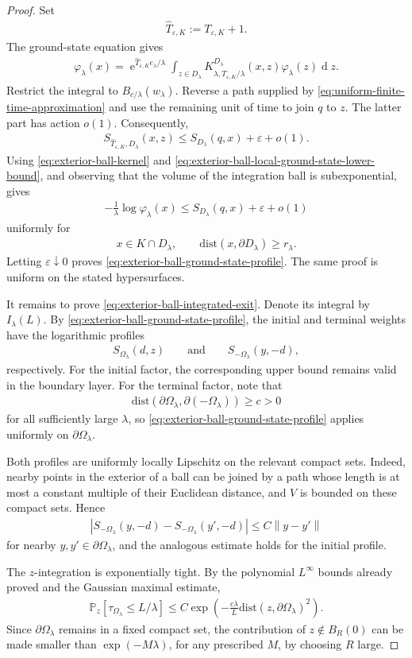 \documentclass[a4paper,10pt]{article}
\numberwithin{equation}{section}
\theoremstyle{plain}
\theoremstyle{plain}
\theoremstyle{plain}
\theoremstyle{plain}
\theoremstyle{plain}
\theoremstyle{remark}
\theoremstyle{definition}
\newcommand{\ee}{\operatorname{e}}
\newcommand{\PP}{\mathbb{P}}
\newcommand\norm[1]{\left\lVert#1\right\rVert}
\newcommand{\dif}{\operatorname{d}\!} %
\newcommand{\vf}{\varphi}
\newcommand{\dist}{\mathrm{dist}}
\newcommand{\abs}[1]{\left\lvert#1\right\rvert}
\newcommand{\eq}[1]{\begin{align*}#1\end{align*}}
\newcommand{\br}[1]{\left(#1\right)}
\begin{document}
\begin{proof}
Set
\eq{
\widehat T_{\varepsilon,K}
:=
T_{\varepsilon,K}+1.
}
The ground-state equation gives
\eq{
\vf_\lambda(x)
=
\ee^{
\widehat T_{\varepsilon,K}e_\lambda/\lambda
}
\int_{z\in D_\lambda}
K_{\lambda,
\widehat T_{\varepsilon,K}/\lambda}^{D_\lambda}(x,z)
\vf_\lambda(z)
\dif{z}.
}
Restrict the integral to
$B_{c/\lambda}(w_\lambda)$. Reverse a path supplied by
\cref{eq:uniform-finite-time-approximation} and use the remaining
unit of time to join $q$ to $z$. The latter part has action $o(1)$.
Consequently,
\eq{
S_{\widehat T_{\varepsilon,K},D_\lambda}(x,z)
\leq
S_{D_\lambda}(q,x)
+
\varepsilon
+
o(1).
}
Using \cref{eq:exterior-ball-kernel} and
\cref{eq:exterior-ball-local-ground-state-lower-bound}, and observing
that the volume of the integration ball is subexponential, gives
\eq{
-\frac1\lambda
\log
\vf_\lambda(x)
\leq
S_{D_\lambda}(q,x)
+
\varepsilon
+
o(1)
}
uniformly for
\eq{
x\in K\cap D_\lambda,
\qquad
\dist(x,\partial D_\lambda)
\geq
r_\lambda.
}
Letting $\varepsilon\downarrow0$ proves
\cref{eq:exterior-ball-ground-state-profile}. The same proof is
uniform on the stated hypersurfaces.

It remains to prove
\cref{eq:exterior-ball-integrated-exit}. Denote its integral by
$I_\lambda(L)$. By
\cref{eq:exterior-ball-ground-state-profile}, the initial and terminal
weights have the logarithmic profiles
\eq{
S_{\Omega_\lambda}(d,z)
\qquad\text{and}\qquad
S_{-\Omega_\lambda}(y,-d),
}
respectively. For the initial factor, the corresponding upper bound
remains valid in the boundary layer. For the terminal factor, note
that
\eq{
\dist\br{
\partial\Omega_\lambda,
\partial(-\Omega_\lambda)
}
\geq
c>0
}
for all sufficiently large $\lambda$, so
\cref{eq:exterior-ball-ground-state-profile} applies uniformly on
$\partial\Omega_\lambda$.

Both profiles are uniformly locally Lipschitz on the relevant compact
sets. Indeed, nearby points in the exterior of a ball can be joined by
a path whose length is at most a constant multiple of their Euclidean
distance, and $V$ is bounded on these compact sets. Hence
\eq{
\abs{
S_{-\Omega_\lambda}(y,-d)
-
S_{-\Omega_\lambda}(y',-d)
}
\leq
C\norm{y-y'}
}
for nearby $y,y'\in\partial\Omega_\lambda$, and the analogous estimate
holds for the initial profile.

The $z$-integration is exponentially tight. By the polynomial
$L^\infty$ bounds already proved and the Gaussian maximal estimate,
\eq{
\PP_z\left[
\tau_{\Omega_\lambda}
\leq
L/\lambda
\right]
\leq
C
\exp\left(
-\frac{c\lambda}{L}
\dist\br{
z,
\partial\Omega_\lambda
}^2
\right).
}
Since $\partial\Omega_\lambda$ remains in a fixed compact set, the
contribution of $z\notin B_R(0)$ can be made smaller than
$\exp(-M\lambda)$, for any prescribed $M$, by choosing $R$ large.


\end{proof}
\end{document}
